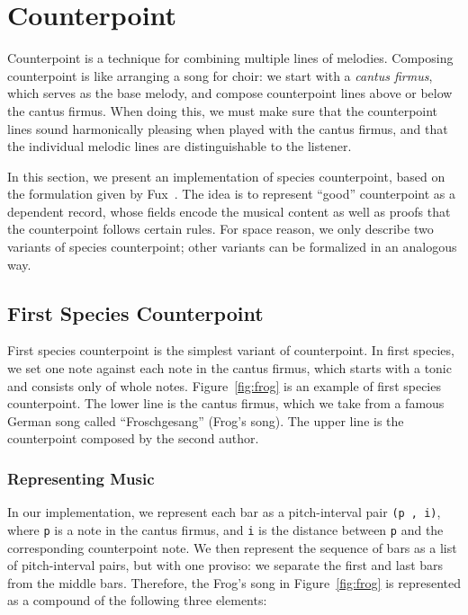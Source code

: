 \section{Counterpoint}
\label{sec:cp}

Counterpoint is a technique for combining multiple lines of melodies.
Composing counterpoint is like arranging a song for choir:
we start with a \emph{cantus firmus}, which serves as the base melody,
and compose counterpoint lines above or below the cantus firmus.
When doing this, we must make sure that the counterpoint lines sound
harmonically pleasing when played with the cantus firmus,
and that the individual melodic lines are distinguishable to the listener.

In this section, we present an implementation of species counterpoint,
based on the formulation given by Fux~\citep{fux-cp}.
The idea is to represent ``good'' counterpoint  as a dependent record,
whose fields encode the musical content as well as proofs that the
counterpoint follows certain rules.
For space reason, we only describe two variants of species counterpoint;
other variants can be formalized in an analogous way.

\subsection{First Species Counterpoint}
\label{sec:cp:fs}

First species counterpoint is the simplest variant of counterpoint.
In first species, we set one note against each note in the cantus firmus,
which starts with a tonic and consists only of whole notes.
Figure~\ref{fig:frog} is an example of first species counterpoint.
The lower line is the cantus firmus, which we take from a famous
German song called ``Froschgesang'' (Frog's song).
The upper line is the counterpoint composed by the second author.

\subsubsection{Representing Music}

In our implementation, we represent each bar as a pitch-interval
pair \texttt{(p ,  i)}, where \texttt{p} is a note in the cantus firmus,
and \texttt{i} is the distance between \texttt{p} and the corresponding
counterpoint note.
We then represent the sequence of bars as a list of pitch-interval pairs,
but with one proviso: we separate the first and last bars from the
middle bars.
Therefore, the Frog's song in Figure~\ref{fig:frog} is represented as a
compound of the following three elements:

